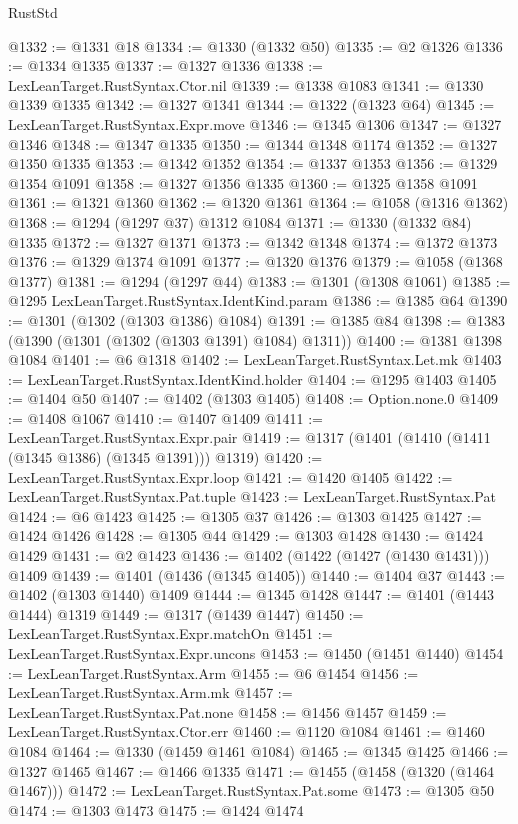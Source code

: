 \begin{lexlean}{RustStd}
\begin{coremodule}
{\begin{coremodule}
{{{{{{{{{{{{{{{{{{{{{{{{{{{{{{{{{{{{{{@1332 := @1331 @18
@1334 := @1330 (@1332 @50)
@1335 := @2 @1326
@1336 := @1334 @1335
@1337 := @1327 @1336
@1338 := LexLeanTarget.RustSyntax.Ctor.nil
@1339 := @1338 @1083
@1341 := @1330 @1339 @1335
@1342 := @1327 @1341
@1344 := @1322 (@1323 @64)
@1345 := LexLeanTarget.RustSyntax.Expr.move
@1346 := @1345 @1306
@1347 := @1327 @1346
@1348 := @1347 @1335
@1350 := @1344 @1348 @1174
@1352 := @1327 @1350 @1335
@1353 := @1342 @1352
@1354 := @1337 @1353
@1356 := @1329 @1354 @1091
@1358 := @1327 @1356 @1335
@1360 := @1325 @1358 @1091
@1361 := @1321 @1360
@1362 := @1320 @1361
@1364 := @1058 (@1316 @1362)
@1368 := @1294 (@1297 @37) @1312 @1084
@1371 := @1330 (@1332 @84) @1335
@1372 := @1327 @1371
@1373 := @1342 @1348
@1374 := @1372 @1373
@1376 := @1329 @1374 @1091
@1377 := @1320 @1376
@1379 := @1058 (@1368 @1377)
@1381 := @1294 (@1297 @44)
@1383 := @1301 (@1308 @1061)
@1385 := @1295 LexLeanTarget.RustSyntax.IdentKind.param
@1386 := @1385 @64
@1390 := @1301 (@1302 (@1303 @1386) @1084)
@1391 := @1385 @84
@1398 := @1383 (@1390 (@1301 (@1302 (@1303 @1391) @1084) @1311))
@1400 := @1381 @1398 @1084
@1401 := @6 @1318
@1402 := LexLeanTarget.RustSyntax.Let.mk
@1403 := LexLeanTarget.RustSyntax.IdentKind.holder
@1404 := @1295 @1403
@1405 := @1404 @50
@1407 := @1402 (@1303 @1405)
@1408 := Option.none.{0}
@1409 := @1408 @1067
@1410 := @1407 @1409
@1411 := LexLeanTarget.RustSyntax.Expr.pair
@1419 := @1317 (@1401 (@1410 (@1411 (@1345 @1386) (@1345 @1391))) @1319)
@1420 := LexLeanTarget.RustSyntax.Expr.loop
@1421 := @1420 @1405
@1422 := LexLeanTarget.RustSyntax.Pat.tuple
@1423 := LexLeanTarget.RustSyntax.Pat
@1424 := @6 @1423
@1425 := @1305 @37
@1426 := @1303 @1425
@1427 := @1424 @1426
@1428 := @1305 @44
@1429 := @1303 @1428
@1430 := @1424 @1429
@1431 := @2 @1423
@1436 := @1402 (@1422 (@1427 (@1430 @1431))) @1409
@1439 := @1401 (@1436 (@1345 @1405))
@1440 := @1404 @37
@1443 := @1402 (@1303 @1440) @1409
@1444 := @1345 @1428
@1447 := @1401 (@1443 @1444) @1319
@1449 := @1317 (@1439 @1447)
@1450 := LexLeanTarget.RustSyntax.Expr.matchOn
@1451 := LexLeanTarget.RustSyntax.Expr.uncons
@1453 := @1450 (@1451 @1440)
@1454 := LexLeanTarget.RustSyntax.Arm
@1455 := @6 @1454
@1456 := LexLeanTarget.RustSyntax.Arm.mk
@1457 := LexLeanTarget.RustSyntax.Pat.none
@1458 := @1456 @1457
@1459 := LexLeanTarget.RustSyntax.Ctor.err
@1460 := @1120 @1084
@1461 := @1460 @1084
@1464 := @1330 (@1459 @1461 @1084)
@1465 := @1345 @1425
@1466 := @1327 @1465
@1467 := @1466 @1335
@1471 := @1455 (@1458 (@1320 (@1464 @1467)))
@1472 := LexLeanTarget.RustSyntax.Pat.some
@1473 := @1305 @50
@1474 := @1303 @1473
@1475 := @1424 @1474
}}}}}}}}}}}}}}}}}}}}}}}}}}}}}}}}}}}}}}
\end{coremodule}}
\end{coremodule}
\end{lexlean}
